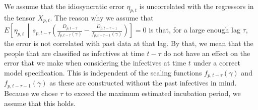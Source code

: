 \documentclass[12pt]{article}
\begin{document}
	We assume that the idiosyncratic error $\eta_{p,t}$ is uncorrelated with the regressors in the tensor $X_{p,t}$. The reason why we assume that $E\left[\eta_{p,t} \,\middle|\, s_{p,t-\tau}\left(\frac{D_{p,t-\tau}}{f_{p,t-\tau}(\gamma)} - \frac{D_{p,t-\tau-1}}{f_{p,t-\tau-1}(\gamma)}\right)\right] = 0$ is that, for a large enough lag $\tau$, the error is not correlated with past data at that lag. By that, we mean that the people that are classified as infectives at time $t-\tau$ do not have an effect on the error that we make when considering the infectives at time $t$ under a correct model specification. This is independent of the scaling functions $f_{p,t-\tau}(\gamma)$ and $f_{p,t-\tau-1}(\gamma)$ as these are constructed without the past infectives in mind. Because we chose $\tau$ to exceed the maximum estimated incubation period, we assume that this holds.
	\\

	    
	    
	
	
\end{document}
